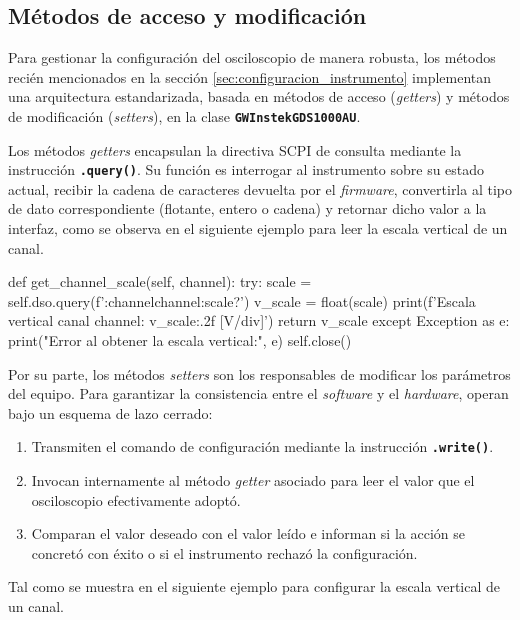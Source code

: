 \subsection{Métodos de acceso y modificación}
Para gestionar la configuración del osciloscopio de manera robusta, los métodos recién mencionados en la sección \ref{sec:configuracion_instrumento} implementan una arquitectura estandarizada, basada en métodos de acceso (\textit{getters}) y métodos de modificación (\textit{setters}), en la clase \textbf{\texttt{GWInstekGDS1000AU}}.\par
Los métodos \textit{getters} encapsulan la directiva SCPI de consulta mediante la instrucción \textbf{\texttt{.query()}}. Su función es interrogar al instrumento sobre su estado actual, recibir la cadena de caracteres devuelta por el \textit{firmware}, convertirla al tipo de dato correspondiente (flotante, entero o cadena) y retornar dicho valor a la interfaz, como se observa en el siguiente ejemplo para leer la escala vertical de un canal.\par

\begin{python}
def get_channel_scale(self, channel):
    try:
        scale = self.dso.query(f':channel{channel}:scale?')
        v_scale = float(scale)
        print(f'Escala vertical canal {channel}: {v_scale:.2f} [V/div]')
        return v_scale
    except Exception as e:
        print("Error al obtener la escala vertical:", e)
        self.close()
\end{python}

Por su parte, los métodos \textit{setters} son los responsables de modificar los parámetros del equipo. Para garantizar la consistencia entre el \textit{software} y el \textit{hardware}, operan bajo un esquema de lazo cerrado:

\begin{enumerate}
    \item Transmiten el comando de configuración mediante la instrucción \textbf{\texttt{.write()}}.
    \item Invocan internamente al método \textit{getter} asociado para leer el valor que el osciloscopio efectivamente adoptó.
    \item Comparan el valor deseado con el valor leído e informan si la acción se concretó con éxito o si el instrumento rechazó la configuración.
\end{enumerate}

Tal como se muestra en el siguiente ejemplo para configurar la escala vertical de un canal.\par

